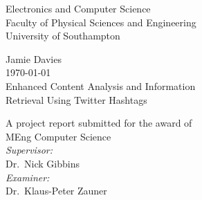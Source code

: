 \documentclass[11pt,a4paper]{report}
\begin{document}
\begin{titlepage}
\center
\vspace*{3cm}

{\Large
    Electronics and Computer Science\\
    Faculty of Physical Sciences and Engineering\\
    University of Southampton\\[1cm]
}

Jamie Davies\\
\today\\[1cm]

{\Large
    Enhanced Content Analysis and Information\\
    Retrieval Using Twitter Hashtags\\[1cm]
}

A project report submitted for the award of\\
MEng Computer Science\\[1cm]

\emph{Supervisor:}\\
Dr.\ Nick Gibbins\\[0.5cm]

\emph{Examiner:}\\
Dr.\ Klaus-Peter Zauner\\


\vfill
\end{titlepage}

\end{document}
